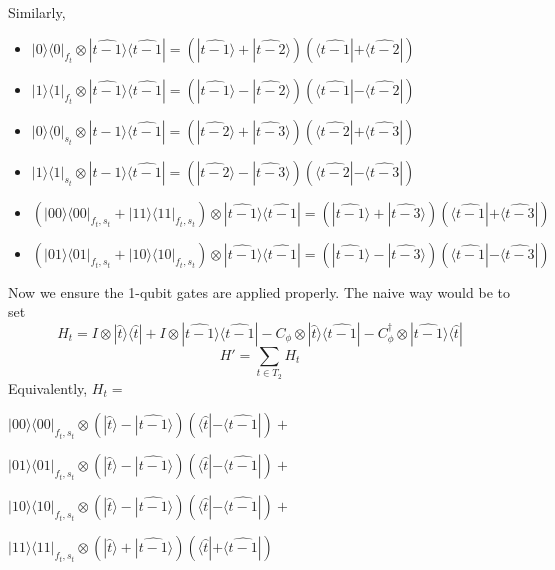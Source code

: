 \documentclass{article}
\theoremstyle{definition}
\begin{document}
Similarly,
\begin{itemize}
	\item $|0\rangle\langle0|_{f_t}\otimes
		|\widehat{t-1}\rangle\langle\widehat{t-1}|
		=(|\widehat{t-1}\rangle+|\widehat{t-2}\rangle)
		(\langle\widehat{t-1}|+\langle\widehat{t-2}|)$
	\item $|1\rangle\langle1|_{f_t}\otimes
		|\widehat{t-1}\rangle\langle\widehat{t-1}|
		=(|\widehat{t-1}\rangle-|\widehat{t-2}\rangle)
		(\langle\widehat{t-1}|-\langle\widehat{t-2}|)$
	\item $|0\rangle\langle0|_{s_t}\otimes
		|\widehat{t-1}\rangle\langle\widehat{t-1}|
		=(|\widehat{t-2}\rangle+|\widehat{t-3}\rangle)
		(\langle\widehat{t-2}|+\langle\widehat{t-3}|)$
	\item $|1\rangle\langle1|_{s_t}\otimes
		|\widehat{t-1}\rangle\langle\widehat{t-1}|
		=(|\widehat{t-2}\rangle-|\widehat{t-3}\rangle)
		(\langle\widehat{t-2}|-\langle\widehat{t-3}|)$
	\item $(|00\rangle\langle00|_{f_t,s_t}
		+|11\rangle\langle11|_{f_t,s_t})\otimes
		|\widehat{t-1}\rangle\langle\widehat{t-1}|
		=(|\widehat{t-1}\rangle+|\widehat{t-3}\rangle)
		(\langle\widehat{t-1}|+\langle\widehat{t-3}|)$
	\item $(|01\rangle\langle01|_{f_t,s_t}
		+|10\rangle\langle10|_{f_t,s_t})\otimes
		|\widehat{t-1}\rangle\langle\widehat{t-1}|
		=(|\widehat{t-1}\rangle-|\widehat{t-3}\rangle)
		(\langle\widehat{t-1}|-\langle\widehat{t-3}|)$
\end{itemize}

Now we ensure the 1-qubit gates are applied properly. The naive way would be to set
	$$H_t=I\otimes|\widehat t\rangle\langle\widehat t|
		+I\otimes|\widehat{t-1}\rangle\langle\widehat{t-1}|
		-C_\phi\otimes|\widehat t\rangle\langle\widehat{t-1}|
		-C_\phi^\dagger\otimes|\widehat{t-1}\rangle\langle\widehat{t}|$$
	$$H'=\sum_{t\in T_2}H_t$$
	Equivalently, $H_t=$

	$|00\rangle\langle00|_{f_t,s_t}\otimes
		(|\widehat{t}\rangle-|\widehat{t-1}\rangle)
		(\langle\widehat{t}|-\langle\widehat{t-1}|)+$

	$|01\rangle\langle01|_{f_t,s_t}\otimes
		(|\widehat{t}\rangle-|\widehat{t-1}\rangle)
		(\langle\widehat{t}|-\langle\widehat{t-1}|)+$

	$|10\rangle\langle10|_{f_t,s_t}\otimes
		(|\widehat{t}\rangle-|\widehat{t-1}\rangle)
		(\langle\widehat{t}|-\langle\widehat{t-1}|)+$

	$|11\rangle\langle11|_{f_t,s_t}\otimes
		(|\widehat{t}\rangle+|\widehat{t-1}\rangle)
		(\langle\widehat{t}|+\langle\widehat{t-1}|)$
\end{document}
